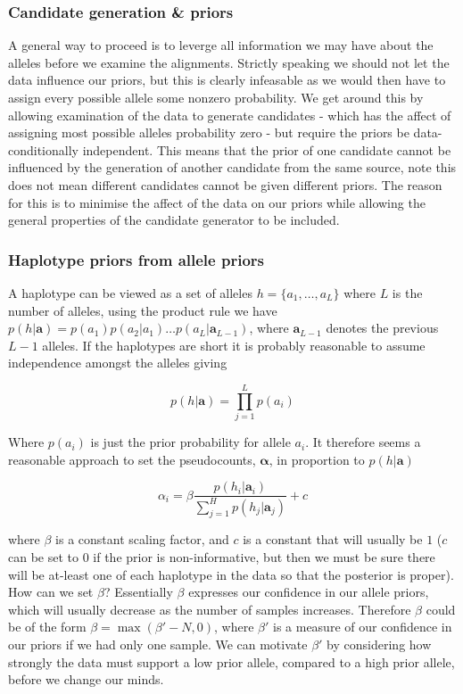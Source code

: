 \documentclass{article}
\begin{document}
\subsubsection{Candidate generation \& priors}

A general way to proceed is to leverge all information we may have about the alleles before we examine the alignments. Strictly speaking we should not let the data influence our priors, but this is clearly infeasable as we would then have to assign every possible allele some nonzero probability. We get around this by allowing examination of the data to generate candidates - which has the affect of assigning most possible alleles probability zero - but require the priors be data-conditionally independent. This means that the prior of one candidate cannot be influenced by the generation of another candidate from the same source, note this does not mean different candidates cannot be given different priors. The reason for this is to minimise the affect of the data on our priors while allowing the general properties of the candidate generator to be included.

\subsubsection{Haplotype priors from allele priors}

A haplotype can be viewed as a set of alleles $h = \{a_1, \dots, a_L\}$ where $L$ is the number of alleles, using the product rule we have $p(h | \boldsymbol{a}) = p(a_1)p(a_2 | a_1)\dots p(a_L | \boldsymbol{a}_{L-1})$, where $\boldsymbol{a}_{L-1}$ denotes the previous $L-1$ alleles. If the haplotypes are short it is probably reasonable to assume independence amongst the alleles giving

\begin{equation}
    p(h | \boldsymbol{a}) = \prod_{j = 1}^L p(a_i)
\end{equation}

Where $p(a_i)$ is just the prior probability for allele $a_i$. It therefore seems a reasonable approach to set the pseudocounts, $\boldsymbol{\alpha}$, in proportion to $p(h | \boldsymbol{a})$

\begin{equation}
    \alpha_i = \beta \frac{p(h_i | \boldsymbol{a}_i)}{\sum_{j = 1}^H p(h_j | \boldsymbol{a}_j)} + c
\end{equation}

where $\beta$ is a constant scaling factor, and $c$ is a constant that will usually be $1$ ($c$ can be set to $0$ if the prior is non-informative, but then we must be sure there will be at-least one of each haplotype in the data so that the posterior is proper). How can we set $\beta$? Essentially $\beta$ expresses our confidence in our allele priors, which will usually decrease as the number of samples increases. Therefore $\beta$ could be of the form $\beta = \max(\beta' - N, 0)$, where $\beta'$ is a measure of our confidence in our priors if we had only one sample. We can motivate $\beta'$ by considering how strongly the data must support a low prior allele, compared to a high prior allele, before we change our minds.
\end{document}
